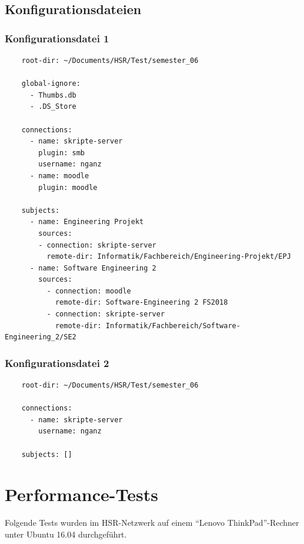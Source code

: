\documentclass[a4paper]{article}
\let\oldsection\section
\renewcommand\section{\clearpage\oldsection}
\begin{document}
  \pagebreak

  \subsection{Konfigurationsdateien}

  \subsubsection{Konfigurationsdatei 1}

  \begin{verbatim}
    root-dir: ~/Documents/HSR/Test/semester_06

    global-ignore:
      - Thumbs.db
      - .DS_Store

    connections:
      - name: skripte-server
        plugin: smb
        username: nganz
      - name: moodle
        plugin: moodle

    subjects:
      - name: Engineering Projekt
        sources:
        - connection: skripte-server
          remote-dir: Informatik/Fachbereich/Engineering-Projekt/EPJ
      - name: Software Engineering 2
        sources:
          - connection: moodle
            remote-dir: Software-Engineering 2 FS2018
          - connection: skripte-server
            remote-dir: Informatik/Fachbereich/Software-Engineering_2/SE2
  \end{verbatim}

  \subsubsection{Konfigurationsdatei 2}

  \begin{verbatim}
    root-dir: ~/Documents/HSR/Test/semester_06

    connections:
      - name: skripte-server
        username: nganz

    subjects: []
  \end{verbatim}

  \section{Performance-Tests}

  Folgende Tests wurden im HSR-Netzwerk auf einem ``Lenovo ThinkPad''-Rechner unter Ubuntu 16.04 durchgeführt.
\end{document}
